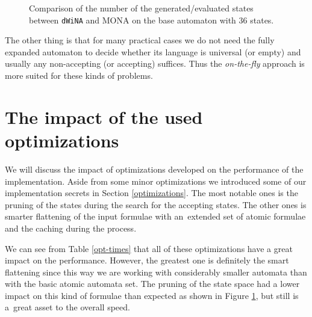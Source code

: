 \begin{figure}[h!]
 \begin{center}
 \end{center}
 \caption{Comparison of the number of the generated/evaluated states between
 \texttt{dWiNA} and \textsc{MONA} on the base automaton with $36$
 states.}\label{state-graph}
\end{figure}
\newpage
The other thing is that for many practical cases we do not need the fully
expanded automaton to decide whether its language is universal (or empty) and usually any
non-accepting (or accepting) suffices. Thus the \emph{on-the-fly} approach is
more suited for these kinds of problems.

\section{The impact of the used optimizations}

We will discuss the impact of optimizations developed
on the performance of the implementation. Aside from some minor
optimizations we introduced some of our implementation secrets in Section \ref{optimizations}.
The most notable ones is the pruning of the states during the search for the
accepting states. The other ones is smarter flattening of the input formulae
with an~extended set of atomic formulae and the caching during the process.

We can see from Table \ref{opt-times} that all of these optimizations have a
great impact on the performance. However, the greatest one is definitely the
smart flattening since this way we are working with considerably smaller automata than
with the basic atomic automata set. The pruning of the state space had a lower
impact on this kind of formulae than expected as shown in Figure
\ref{state-graph}, but still is a~great asset to the overall speed.

